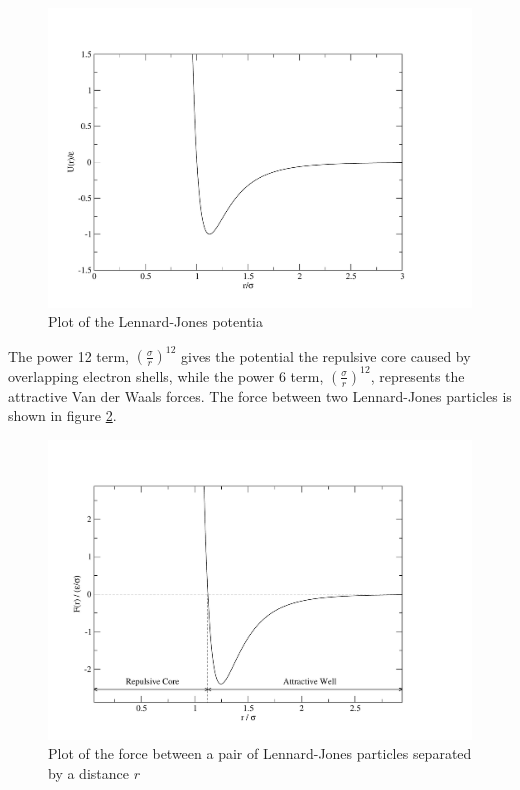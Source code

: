 \documentclass[12pt]{UoAthesis}
\begin{document}
\begin{figure}[htp] 
  \begin{center}
    \includegraphics[clip,width=\textwidth]{figures/ljPlot} 
    \caption{\label{fig:ljPot} Plot of the Lennard-Jones potentia} 
  \end{center}
\end{figure}

The power 12 term, $\left(\frac{\sigma}{r}\right)^{12}$ gives the
potential the repulsive core caused by overlapping electron shells,
while the power 6 term, $\left(\frac{\sigma}{r}\right)^{12}$,
represents the attractive Van der Waals forces.  The force between two
Lennard-Jones particles is shown in figure \ref{fig:ljForce}.

\begin{figure}[htp] 
  \begin{center}
    \includegraphics[clip,width=\textwidth]{figures/ljForce} 
    \caption{\label{fig:ljForce} Plot of the force between
      a pair of Lennard-Jones particles separated by a distance $r$}
  \end{center}
\end{figure}
\end{document}
